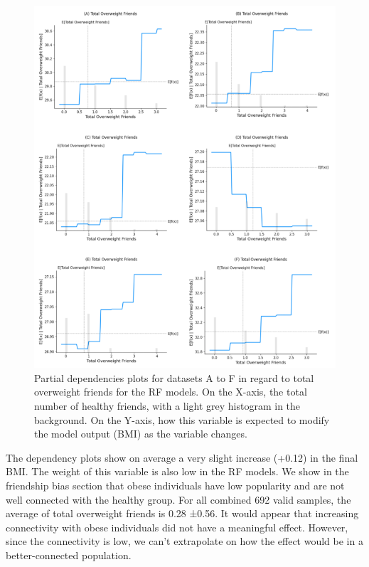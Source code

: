     \begin{figure}[ht]
        \centering
            \includegraphics[width=0.9\linewidth]{figures/Results/ResultThree/PDOverweight.png } 
        \caption{Partial dependencies plots for datasets A to F in regard to total overweight friends for the RF models. On the X-axis, the total number of healthy friends, with a light grey histogram in the background. On the Y-axis, how this variable is expected to modify the model output (BMI) as the variable changes.}
        \label{figure:Results3PDObese}
    \end{figure}    

The dependency plots show on average a very slight increase (+0.12) in the final BMI. The weight of this variable is also low in the RF models. We show in the friendship bias section that obese individuals have low popularity and are not well connected with the healthy group. For all combined 692 valid samples, the average of total overweight friends is 0.28 ±0.56.  It would appear that increasing connectivity with obese individuals did not have a meaningful effect. However, since the connectivity is low, we can’t extrapolate on how the effect would be in a better-connected population. 
 
